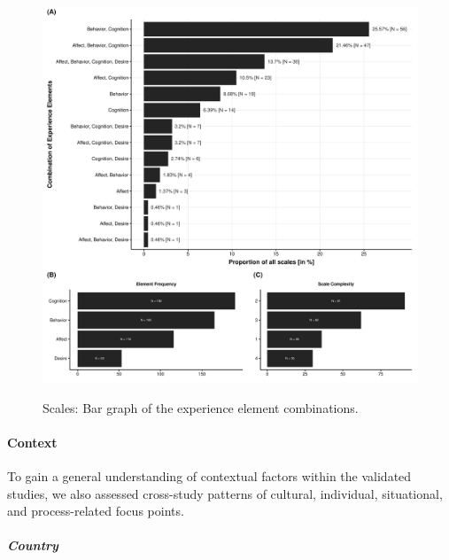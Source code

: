 \begin{figure}[h]
\centering
\caption{Scales: Bar graph of the experience element combinations.}
\includegraphics[width=\textwidth]{Figures/ABCDFreq-1}
\label{fig:ElementsScales}
\end{figure}



\paragraph{Context}

To gain a general understanding of contextual factors within the
validated studies, we also assessed cross-study patterns of cultural,
individual, situational, and process-related focus points.

\subparagraph{Country}

